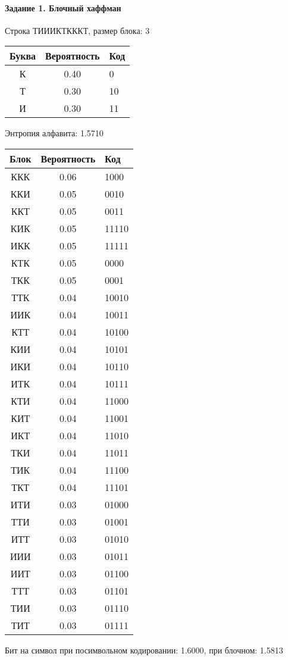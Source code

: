 \documentclass[a4paper, 12pt]{article}
\begin{document}
\paragraph{Задание 1. Блочный хаффман \\}

Строка ТИИИКТКККТ, размер блока: 3
\begin{center}
 \begin{tabular}{ |c|c|l| } 
  \hline
     Буква & Вероятность & Код\\ \hline
К & 0.40 & 0\\\hline
Т & 0.30 & 10\\\hline
И & 0.30 & 11
\\ \hline \end{tabular}
\end{center}
Энтропия алфавита: 1.5710
\begin{center}
 \begin{tabular}{ |c|c|l| } 
  \hline
     Блок & Вероятность & Код\\ \hline
ККК & 0.06 & 1000\\\hline
ККИ & 0.05 & 0010\\\hline
ККТ & 0.05 & 0011\\\hline
КИК & 0.05 & 11110\\\hline
ИКК & 0.05 & 11111\\\hline
КТК & 0.05 & 0000\\\hline
ТКК & 0.05 & 0001\\\hline
ТТК & 0.04 & 10010\\\hline
ИИК & 0.04 & 10011\\\hline
КТТ & 0.04 & 10100\\\hline
КИИ & 0.04 & 10101\\\hline
ИКИ & 0.04 & 10110\\\hline
ИТК & 0.04 & 10111\\\hline
КТИ & 0.04 & 11000\\\hline
КИТ & 0.04 & 11001\\\hline
ИКТ & 0.04 & 11010\\\hline
ТКИ & 0.04 & 11011\\\hline
ТИК & 0.04 & 11100\\\hline
ТКТ & 0.04 & 11101\\\hline
ИТИ & 0.03 & 01000\\\hline
ТТИ & 0.03 & 01001\\\hline
ИТТ & 0.03 & 01010\\\hline
ИИИ & 0.03 & 01011\\\hline
ИИТ & 0.03 & 01100\\\hline
ТТТ & 0.03 & 01101\\\hline
ТИИ & 0.03 & 01110\\\hline
ТИТ & 0.03 & 01111
\\ \hline \end{tabular}
\end{center}
Бит на символ при посимвольном кодировании: 1.6000, при блочном: 1.5813
\end{document}
